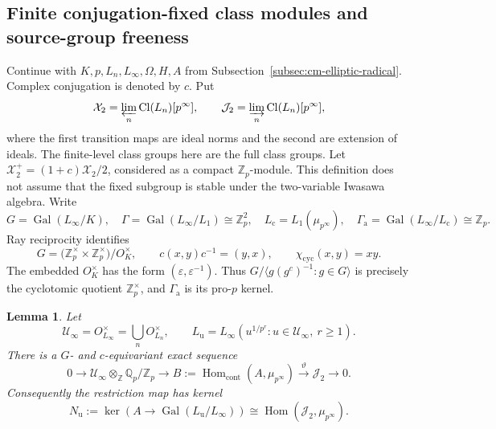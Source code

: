 \documentclass[11pt]{article}
\newtheorem{lemma}[theorem]{Lemma}
\theoremstyle{definition}\newtheorem{definition}[theorem]{Definition}
\begin{document}
\subsection{Finite conjugation-fixed class modules and source-group freeness}
\label{subsec:cm-finite-plus}

Continue with \(K,p,L_n,L_\infty,\Omega,H,A\) from
Subsection~\ref{subsec:cm-elliptic-radical}.
Complex conjugation is denoted by \(c\).
Put
\[
 \mathcal X_2=\varprojlim_n\operatorname{Cl}(L_n)[p^\infty],
 \qquad
 \mathcal J_2=\varinjlim_n\operatorname{Cl}(L_n)[p^\infty],
\]
where the first transition maps are ideal norms and the second
are extension of ideals.
The finite-level class groups here are the full class groups.
Let \(\mathcal X_2^+=(1+c)\mathcal X_2/2\), considered as a compact
\(\mathbb Z_p\)-module.
This definition does not assume that the fixed subgroup is stable
under the two-variable Iwasawa algebra.
Write
\[
 G=\operatorname{Gal}(L_\infty/K),\quad
 \Gamma=\operatorname{Gal}(L_\infty/L_1)\cong\mathbb Z_p^2,\quad
 L_{\mathrm c}=L_1(\mu_{p^\infty}),\quad
 \Gamma_{\mathrm a}=\operatorname{Gal}(L_\infty/L_{\mathrm c})
                   \cong\mathbb Z_p .
\]
Ray reciprocity identifies
\[
 G=\bigl(\mathbb Z_p^\times\times\mathbb Z_p^\times\bigr)/O_K^\times,
 \qquad
 c(x,y)c^{-1}=(y,x),\qquad
 \chi_{\mathrm{cyc}}(x,y)=xy.
\]
The embedded \(O_K^\times\) has the form
\((\varepsilon,\varepsilon^{-1})\).
Thus \(G/\langle g(g^c)^{-1}:g\in G\rangle\) is precisely the
cyclotomic quotient \(\mathbb Z_p^\times\), and
\(\Gamma_{\mathrm a}\) is its pro-\(p\) kernel.

\begin{lemma}\label{lem:cm-full-class-kummer}
Let
\[
 \mathcal U_\infty=O_{L_\infty}^{\times}
       =\bigcup_n O_{L_n}^{\times},\qquad
 L_{\mathrm u}=L_\infty(u^{1/p^r}:
                         u\in\mathcal U_\infty,\ r\geq1).
\]
There is a \(G\)- and \(c\)-equivariant exact sequence
\begin{equation}\label{eq:cm-full-class-kummer}
 0\longrightarrow
 \mathcal U_\infty\otimes_{\mathbb Z}\mathbb Q_p/\mathbb Z_p
 \longrightarrow
 B:=\operatorname{Hom}_{\mathrm{cont}}(A,\mu_{p^\infty})
 \xrightarrow{\vartheta}\mathcal J_2
 \longrightarrow0 .
\end{equation}
Consequently the restriction map has kernel
\begin{equation}\label{eq:cm-unit-annihilator}
 N_{\mathrm u}:=
 \ker\!\left(A\longrightarrow
            \operatorname{Gal}(L_{\mathrm u}/L_\infty)\right)
 \cong\operatorname{Hom}(\mathcal J_2,\mu_{p^\infty}).
\end{equation}
\end{lemma}
\end{document}
